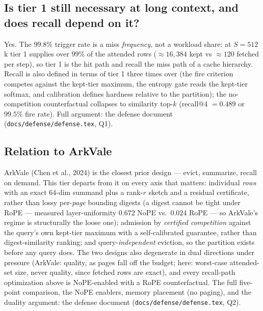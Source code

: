 \documentclass[11pt]{article}
\begin{document}
\subsection{Is tier 1 still necessary at long context, and does recall
depend on it?}\label{sec:tier1need}
Yes. The $99.8\%$ trigger rate is a miss \emph{frequency}, not a workload
share: at $S{=}512$k tier 1 supplies over $99\%$ of the attended rows
(${\approx}16{,}384$ kept vs ${\approx}120$ fetched per step), so tier 1 is
the hit path and recall the miss path of a cache hierarchy. Recall is also
defined in terms of tier 1 three times over (the fire criterion competes
against the kept-tier maximum, the entropy gate reads the kept-tier
softmax, and calibration defines hardness relative to the partition); the
no-competition counterfactual collapses to similarity top-$k$ (recall@4
$=0.489$ or $99.5\%$ fire rate). Full argument: the defense document
(\texttt{docs/defense/defense.tex}, Q1).

\subsection{Relation to ArkVale}
ArkVale (Chen et al., 2024) is the closest prior design --- evict,
summarize, recall on demand. This tier departs from it on every axis that
matters: individual \emph{rows} with an exact 64-dim summand plus a rank-$r$
sketch and a residual certificate, rather than lossy per-\emph{page}
bounding digests (a digest cannot be tight under RoPE --- measured
layer-uniformity $0.672$ NoPE vs.\ $0.024$ RoPE --- so ArkVale's regime is
structurally the loose one); admission by \emph{certified competition}
against the query's own kept-tier maximum with a self-calibrated guarantee,
rather than digest-similarity ranking; and query-\emph{independent}
eviction, so the partition exists before any query does. The two designs
also degenerate in dual directions under pressure (ArkVale: quality, as
pages fall off the budget; here: worst-case attended-set size, never
quality, since fetched rows are exact), and every recall-path optimization
above is NoPE-enabled with a RoPE counterfactual. The full five-point
comparison, the NoPE enablers, memory placement (no paging), and the
duality argument: the defense document
(\texttt{docs/defense/defense.tex}, Q2).
\end{document}
